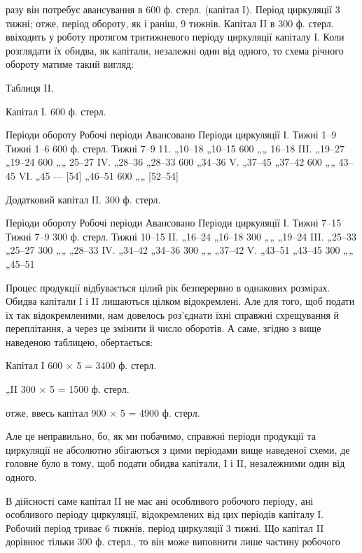 \parcont{}  %
разу він потребує авансування в 600 ф. стерл. (капітал І). Період циркуляції
3 тижні; отже, період обороту, як і раніш, 9 тижнів. Капітал II
в 300 ф. стерл. ввіходить у роботу протягом тритижневого періоду циркуляції
капіталу І. Коли розглядати їх обидва, як капітали, незалежні
один від одного, то схема річного обороту матиме такий вигляд:

Таблиця II.

Капітал І. 600 ф. стерл.

Періоди обороту    Робочі періоди    Авансовано    Періоди циркуляції
І. Тижні 1--9    Тижні 1--6    600 ф. стерл. Тижні 7--9
11. „10--18 „10--15    600 „„ 16--18
III. „19--27 „19--24    600 „„ 25--27
IV. „28--36 „28--33    600 „34--36
V. „37--45 „37--42    600 „„ 43--45
VI. „45 — [54] „46--51    600 „„ [52--54]

Додатковий капітал II. 300 ф. стерл.

Періоди обороту    Робочі періоди    Авансовано    Періоди циркуляції
І. Тижні 7--15    Тижні 7--9    300 ф. стерл. Тижні 10--15
II. „16--24 „16--18    300 „„ „19--24
III. „25--33 „25--27    300 „„ „28--33
IV. „34--42 „34--36    300 „„ „37--42
V. „43--51 „43--45    300 „„ „45--51

Процес продукції відбувається цілий рік безперервно в однакових
розмірах. Обидва капітали І і II лишаються цілком відокремлені. Але
для того, щоб подати їх так відокремленими, нам довелось роз’єднати
їхні справжні схрещування й переплітання, а через це змінити й число
оборотів. А саме, згідно з вище наведеною таблицею, обертається:

Капітал І 600 × 5 = 3400 ф. стерл.

„II 300 × 5 = 1500 ф. стерл.

отже, ввесь капітал    900 × 5 = 4900 ф. стерл.

Але це неправильно, бо, як ми побачимо, справжні періоди продукції
та циркуляції не абсолютно збігаються з цими періодами вище наведеної
схеми, де головне було в тому, щоб подати обидва капітали, І і II, незалежними
один від одного.

В дійсності саме капітал II не має ані особливого робочого періоду, ані особливого
періоду циркуляції, відокремлених від цих періодів капіталу І. Робочий
період триває 6 тижнів, період циркуляції 3 тижні. Що капітал II дорівнює
тільки 300 ф. стерл., то він може виповнити лише частину робочого
\parbreak{}  %
